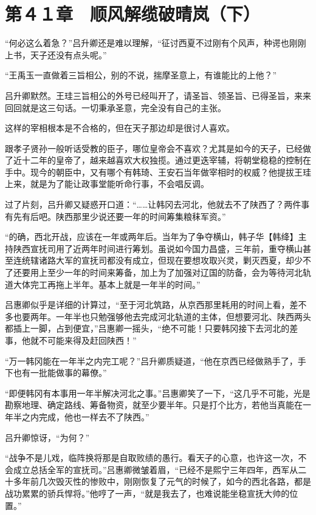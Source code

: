 \section{第４１章　顺风解缆破晴岚（下）}

“何必这么着急？”吕升卿还是难以理解，“征讨西夏不过刚有个风声，种谔也刚刚上书，天子还没有点头呢。”

“王禹玉一直做着三旨相公，别的不说，揣摩圣意上，有谁能比的上他？”

吕升卿默然。王珪三旨相公的外号已经叫开了，请圣旨、领圣旨、已得圣旨，来来回回就是这三句话。一切秉承圣意，完全没有自己的主张。

这样的宰相根本是不合格的，但在天子那边却是很讨人喜欢。

跟孝子贤孙一般听话受教的臣子，哪位皇帝会不喜欢？尤其是如今的天子，已经做了近十二年的皇帝了，越来越喜欢大权独揽。通过更迭宰辅，将朝堂稳稳的控制在手中。现今的朝臣中，又有哪个有韩琦、王安石当年做宰相时的权威？他提拔王珪上来，就是为了能让政事堂能听命行事，不会唱反调。

过了片刻，吕升卿又疑惑开口道：“……让韩冈去河北，他就去不了陕西了？两件事有先有后吧。陕西那里少说还要一年的时间筹集粮秣军资。”

“的确，西北开战，应该在一年或两年后。当年为了争夺横山，韩子华【韩绛】主持陕西宣抚司用了近两年时间进行筹划。虽说如今国力昌盛，三年前，重夺横山甚至连统辖诸路大军的宣抚司都没有成立，但现在要想攻取兴灵，剿灭西夏，却少不了还要用上至少一年的时间来筹备，加上为了加强对辽国的防备，会为等待河北轨道大体完工再拖上半年。基本上就是一年半的时间。”

吕惠卿似乎是详细的计算过，“至于河北筑路，从京西那里耗用的时间上看，差不多也要两年。一年半也只勉强够他去完成河北轨道的主体，但想要河北、陕西两头都插上一脚，占到便宜，”吕惠卿一摇头，“绝不可能！只要韩冈接下去河北的差事，他就不可能来得及赶回陕西！”

“万一韩冈能在一年半之内完工呢？”吕升卿质疑道，“他在京西已经做熟手了，手下也有一批能做事的幕僚。”

“即便韩冈有本事用一年半解决河北之事。”吕惠卿笑了一下，“这几乎不可能，光是勘察地理、确定路线、筹备物资，就至少要半年。只是打个比方，若他当真能在一年半之内完成，他也一样去不了陕西。”

吕升卿惊讶，“为何？”

“战争不是儿戏，临阵换将那是自取败绩的愚行。看天子的心意，也许这一次，不会成立总括全军的宣抚司。”吕惠卿微皱着眉，“已经不是熙宁三年四年，西军从二十多年前几次毁灭性的惨败中，刚刚恢复了元气的时候了，如今的西北各路，都是战功累累的骄兵悍将。”他哼了一声，“就是我去了，也难说能坐稳宣抚大帅的位置。”

